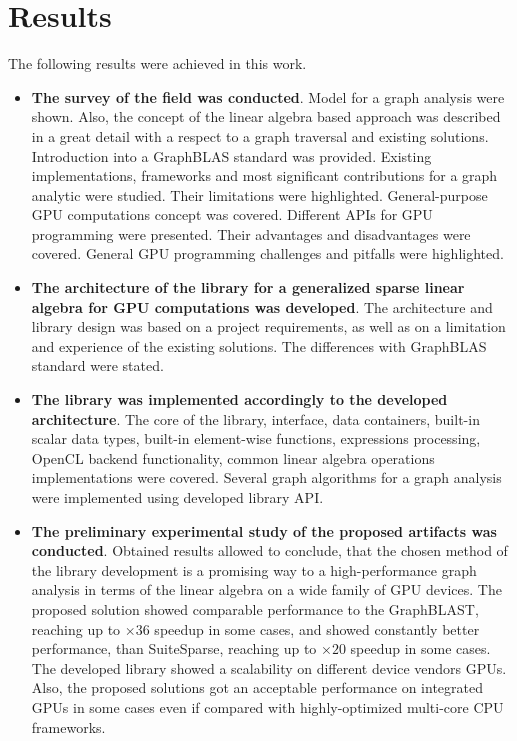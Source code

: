 \section{Results}

The following results were achieved in this work.

\begin{itemize}
    \item \textbf{The survey of the field was conducted}. Model for a graph analysis were shown. Also, the concept of the linear algebra based approach was described in a great detail with a respect to a graph traversal and existing solutions. Introduction into a GraphBLAS standard was provided. Existing implementations, frameworks and most significant contributions for a graph analytic were studied. Their limitations were highlighted. General-purpose GPU computations concept was covered. Different APIs for GPU programming were presented. Their advantages and disadvantages were covered. General GPU programming challenges and pitfalls were highlighted. 
    
    \item \textbf{The architecture of the library for a generalized sparse linear algebra for GPU computations was developed}. The architecture and library design was based on a project requirements, as well as on a limitation and experience of the existing solutions. The differences with GraphBLAS standard were stated.
    
    \item \textbf{The library was implemented accordingly to the developed architecture}. The core of the library, interface, data containers, built-in scalar data types, built-in element-wise functions, expressions processing, OpenCL backend functionality, common linear algebra operations implementations were covered. Several graph algorithms for a graph analysis were implemented using developed library API.
    
    \item \textbf{The preliminary experimental study of the proposed artifacts was conducted}. Obtained results allowed to conclude, that the chosen method of the library development is a promising way to a high-performance graph analysis in terms of the linear algebra on a wide family of GPU devices. The proposed solution showed comparable performance to the GraphBLAST, reaching up to $\times 36$ speedup in some cases, and showed constantly better performance, than SuiteSparse, reaching up to $\times 20$ speedup in some cases. The developed library showed a scalability on different device vendors GPUs. Also, the proposed solutions got an acceptable performance on integrated GPUs in some cases even if compared with highly-optimized multi-core CPU frameworks.
\end{itemize}

